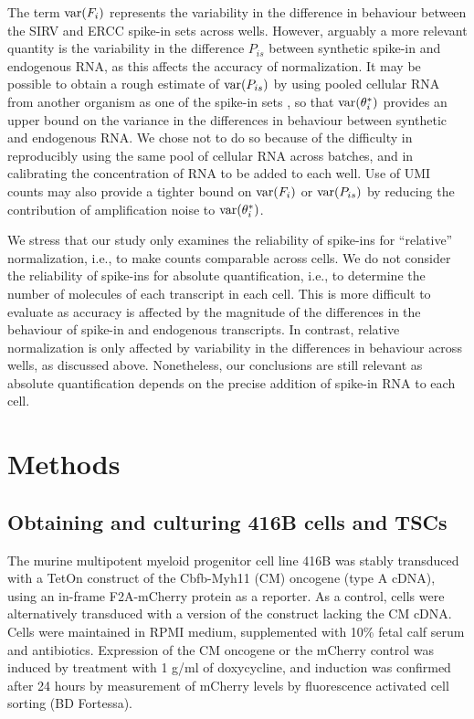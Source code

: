 \documentclass{article}
\begin{document}
The term $\mbox{var}(F_i)$ represents the variability in the difference in behaviour between the SIRV and ERCC spike-in sets across wells.
However, arguably a more relevant quantity is the variability in the difference $P_{is}$ between synthetic spike-in and endogenous RNA, as this affects the accuracy of normalization.
It may be possible to obtain a rough estimate of $\mbox{var}(P_{is})$ by using pooled cellular RNA from another organism as one of the spike-in sets \cite{brennecke2013accounting}, so that $\mbox{var}(\theta^*_i)$ provides an upper bound on the variance in the differences in behaviour between synthetic and endogenous RNA.
We chose not to do so because of the difficulty in reproducibly using the same pool of cellular RNA across batches, and in calibrating the concentration of RNA to be added to each well.
Use of UMI counts may also provide a tighter bound on $\mbox{var}(F_i)$ or $\mbox{var}(P_{is})$ by reducing the contribution of amplification noise to $\mbox{var}(\theta^*_i)$.

We stress that our study only examines the reliability of spike-ins for ``relative'' normalization, i.e., to make counts comparable across cells.
We do not consider the reliability of spike-ins for absolute quantification, i.e., to determine the number of molecules of each transcript in each cell.
This is more difficult to evaluate as accuracy is affected by the magnitude of the differences in the behaviour of spike-in and endogenous transcripts.
In contrast, relative normalization is only affected by variability in the differences in behaviour across wells, as discussed above.
Nonetheless, our conclusions are still relevant as absolute quantification depends on the precise addition of spike-in RNA to each cell.

\section{Methods}

\subsection{Obtaining and culturing 416B cells and TSCs}

The murine multipotent myeloid progenitor cell line 416B \cite{dexter1979isolation} was stably transduced with a TetOn construct of the Cbfb-Myh11 (CM) oncogene (type A cDNA), using an in-frame F2A-mCherry protein as a reporter. 
As a control, cells were alternatively transduced with a version of the construct lacking the CM cDNA. 
Cells were maintained in RPMI medium, supplemented with 10\% fetal calf serum and antibiotics.
Expression of the CM oncogene or the mCherry control was induced by treatment with 1 \textmu{}g/ml of doxycycline, and induction was confirmed after 24 hours by measurement of mCherry levels by fluorescence activated cell sorting (BD Fortessa).
\end{document}
